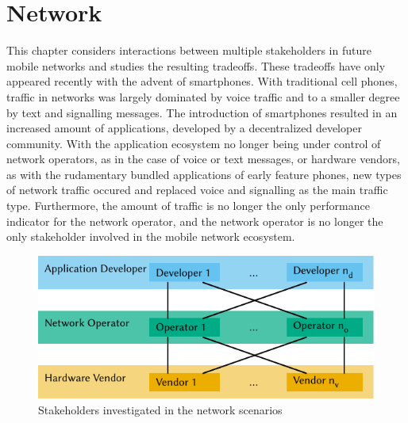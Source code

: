 \chapter{Network}\label{chap:network}
This chapter considers interactions between multiple stakeholders in future mobile networks and studies the resulting tradeoffs.
These tradeoffs have only appeared recently with the advent of smartphones.
With traditional cell phones, traffic in networks was largely dominated by voice traffic and to a smaller degree by text and signalling messages.
The introduction of smartphones resulted in an increased amount of applications, developed by a decentralized developer community.
With the application ecosystem no longer being under control of network operators, as in the case of voice or text messages, or hardware vendors, as with the rudamentary bundled applications of early feature phones, new types of network traffic occured and replaced voice and signalling as the main traffic type.
Furthermore, the amount of traffic is no longer the only performance indicator for the network operator, and the network operator is no longer the only stakeholder involved in the mobile network ecosystem.

\begin{figure}
  \centering
  \includegraphics{network/figures/stakeholders}
  \caption{Stakeholders investigated in the network scenarios}
  \label{fig:network:stakeholders}
\end{figure}


